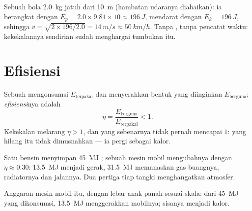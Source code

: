 \begin{example}\label{ex:g10:energy-conservation:fall}
Sebuah bola \qty{2.0}{kg} jatuh dari \qty{10}{m} (hambatan udaranya
diabaikan): ia berangkat dengan
$E_p = 2.0 \times 9.81 \times 10 \approx \qty{196}{J}$, mendarat dengan
$E_k = \qty{196}{J}$, sehingga $v = \sqrt{2 \times 196/2.0} =
\qty{14}{m/s} \approx \qty{50}{km/h}$. Tanpa , tanpa pencatat
waktu: kekekalannya sendirian sudah menghargai tumbukan itu.
\end{example}

\section{Efisiensi}

\begin{definition}[Efisiensi]\label{def:g10:energy-conservation:efficiency}
Sebuah  mengonsumsi $E_{\text{terpakai}}$ dan menyerahkan
bentuk yang diinginkan $E_{\text{berguna}}$;
\emph{efisiensi}nya adalah
\[
\eta = \frac{E_{\text{berguna}}}{E_{\text{terpakai}}} < 1 .
\]
Kekekalan melarang $\eta > 1$, dan  yang sebenarnya tidak
pernah mencapai $1$:  yang hilang itu tidak dimusnahkan --- ia
pergi sebagai kalor.
\end{definition}

\begin{example}\label{ex:g10:energy-conservation:engine}
Satu  bensin menyimpan \qty{45}{MJ} ; sebuah mesin
mobil mengubahnya dengan $\eta \approx 0.30$: \qty{13.5}{MJ} menjadi
gerak, \qty{31.5}{MJ} memanaskan gas buangnya, radiatornya dan
jalannya. Dua pertiga tiap tangki menghangatkan atmosfer.
\end{example}

\begin{omfigure}

{\small Anggaran mesin mobil itu, dengan lebar anak panah sesuai skala:
dari \qty{45}{MJ} yang dikonsumsi, \qty{13.5}{MJ} menggerakkan
mobilnya; sisanya menjadi kalor.}
\end{omfigure}


